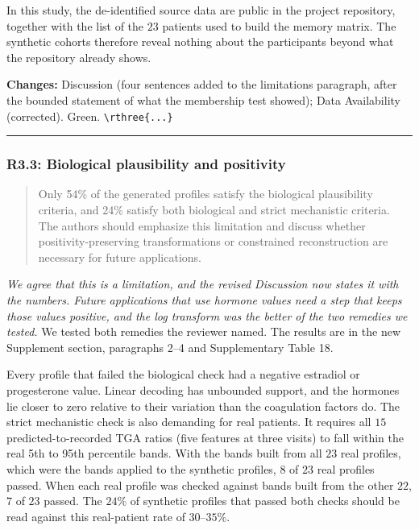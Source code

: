 \documentclass[
  11pt,
  letterpaper,
]{article}
\begin{document}
In this study, the de-identified source data are public in the project
repository, together with the list of the \(23\) patients used to build
the memory matrix. The synthetic cohorts therefore reveal nothing about
the participants beyond what the repository already shows.

\textbf{Changes:} Discussion (four sentences added to the limitations
paragraph, after the bounded statement of what the membership test
showed); Data Availability (corrected). Green.
\texttt{\textbackslash{}rthree\{...\}}

\begin{center}\rule{0.5\linewidth}{0.5pt}\end{center}

\subsubsection{R3.3: Biological plausibility and
positivity}\label{r3.3-biological-plausibility-and-positivity}

\begin{quote}
Only 54\% of the generated profiles satisfy the biological plausibility
criteria, and 24\% satisfy both biological and strict mechanistic
criteria. The authors should emphasize this limitation and discuss
whether positivity-preserving transformations or constrained
reconstruction are necessary for future applications.
\end{quote}

\emph{We agree that this is a limitation, and the revised Discussion now
states it with the numbers. Future applications that use hormone values
need a step that keeps those values positive, and the log transform was
the better of the two remedies we tested.} We tested both remedies the
reviewer named. The results are in the new Supplement section,
paragraphs 2--4 and Supplementary Table 18.

Every profile that failed the biological check had a negative estradiol
or progesterone value. Linear decoding has unbounded support, and the
hormones lie closer to zero relative to their variation than the
coagulation factors do. The strict mechanistic check is also demanding
for real patients. It requires all \(15\) predicted-to-recorded TGA
ratios (five features at three visits) to fall within the real 5th to
95th percentile bands. With the bands built from all \(23\) real
profiles, which were the bands applied to the synthetic profiles, \(8\)
of \(23\) real profiles passed. When each real profile was checked
against bands built from the other \(22\), \(7\) of \(23\) passed. The
\(24\%\) of synthetic profiles that passed both checks should be read
against this real-patient rate of \(30\)--\(35\%\).
\end{document}
